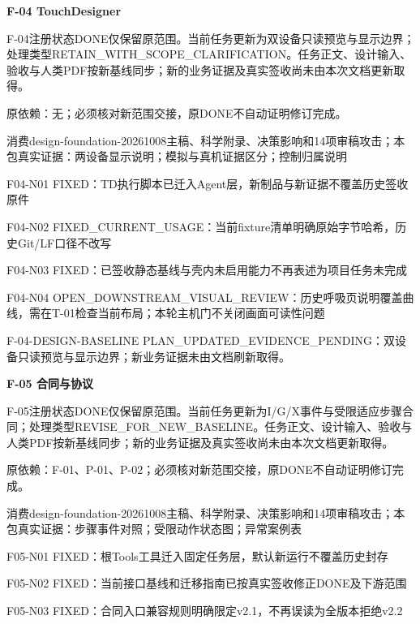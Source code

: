 \documentclass[11pt,a4paper]{article}
\newcommand{\reviewsection}[1]{\par\Needspace{5\baselineskip}\vspace{10pt}\begin{center}{\titlelatin\titlecjk\bfseries\fontsize{14}{20}\selectfont #1}\end{center}}
\begin{document}
\reviewsection{F-\allowbreak{}04 TouchDesigner}
F-\allowbreak{}04注册状态DONE仅保留原范围。当前任务更新为双设备只读预览与显示边界；处理类型RETAIN\_\allowbreak{}WITH\_\allowbreak{}SCOPE\_\allowbreak{}CLARIFICATION。任务正文、设计输入、验收与人类PDF按新基线同步；新的业务证据及真实签收尚未由本次文档更新取得。


原依赖：无；必须核对新范围交接，原DONE不自动证明修订完成。


消费design-\allowbreak{}foundation-\allowbreak{}20261008主稿、科学附录、决策影响和14项审稿攻击；本包真实证据：两设备显示说明；模拟与真机证据区分；控制归属说明


F04-\allowbreak{}N01 FIXED：TD执行脚本已迁入Agent层，新制品与新证据不覆盖历史签收原件


F04-\allowbreak{}N02 FIXED\_\allowbreak{}CURRENT\_\allowbreak{}USAGE：当前fixture清单明确原始字节哈希，历史Git/\allowbreak{}LF口径不改写


F04-\allowbreak{}N03 FIXED：已签收静态基线与壳内未启用能力不再表述为项目任务未完成


F04-\allowbreak{}N04 OPEN\_\allowbreak{}DOWNSTREAM\_\allowbreak{}VISUAL\_\allowbreak{}REVIEW：历史呼吸页说明覆盖曲线，需在T-\allowbreak{}01检查当前布局；本轮主机门不关闭画面可读性问题


F-\allowbreak{}04-\allowbreak{}DESIGN-\allowbreak{}BASELINE PLAN\_\allowbreak{}UPDATED\_\allowbreak{}EVIDENCE\_\allowbreak{}PENDING：双设备只读预览与显示边界；新业务证据未由文档刷新取得。


\reviewsection{F-\allowbreak{}05 合同与协议}
F-\allowbreak{}05注册状态DONE仅保留原范围。当前任务更新为I/\allowbreak{}G/\allowbreak{}X事件与受限适应步骤合同；处理类型REVISE\_\allowbreak{}FOR\_\allowbreak{}NEW\_\allowbreak{}BASELINE。任务正文、设计输入、验收与人类PDF按新基线同步；新的业务证据及真实签收尚未由本次文档更新取得。


原依赖：F-\allowbreak{}01、P-\allowbreak{}01、P-\allowbreak{}02；必须核对新范围交接，原DONE不自动证明修订完成。


消费design-\allowbreak{}foundation-\allowbreak{}20261008主稿、科学附录、决策影响和14项审稿攻击；本包真实证据：步骤事件对照；受限动作状态图；异常案例表


F05-\allowbreak{}N01 FIXED：根Tools工具迁入固定任务层，默认新运行不覆盖历史封存


F05-\allowbreak{}N02 FIXED：当前接口基线和迁移指南已按真实签收修正DONE及下游范围


F05-\allowbreak{}N03 FIXED：合同入口兼容规则明确限定v2.1，不再误读为全版本拒绝v2.2
\end{document}
